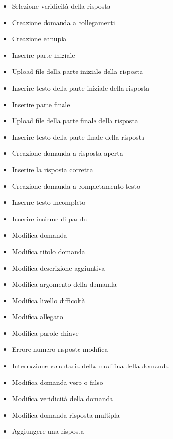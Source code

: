 \begin{itemize}
	\item {} Selezione veridicità della risposta
	\item {} Creazione domanda a collegamenti 
	\item {} Creazione ennupla 
	\item {} Inserire parte iniziale 
	\item {} Upload file della parte iniziale della risposta 
	\item {} Inserire testo della parte iniziale della risposta 
	\item {} Inserire parte finale 
	\item {} Upload file della parte finale della risposta 
	\item {} Inserire testo della parte finale della risposta 
	\item {} Creazione domanda a risposta aperta 
	\item {} Inserire la risposta corretta 
	\item {} Creazione domanda a completamento testo 
	\item {} Inserire testo incompleto
	\item {} Inserire insieme di parole
	\item {} Modifica domanda 
	\item {} Modifica titolo domanda 
	\item {} Modifica descrizione aggiuntiva 
	\item {} Modifica argomento della domanda 
	\item {} Modifica livello difficoltà 
	\item {} Modifica allegato 
	\item {} Modifica parole chiave 
	\item {} Errore numero risposte modifica 
	\item {} Interruzione volontaria della modifica della domanda
	\item {} Modifica domanda vero o falso
	\item {} Modifica veridicità della domanda 
	\item {} Modifica domanda risposta multipla 
	\item {} Aggiungere una risposta

\end{itemize}
